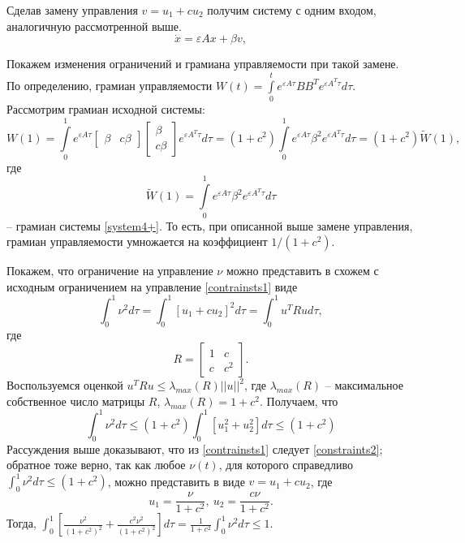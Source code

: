 \documentclass[../main.tex]{subfiles}
\begin{document}
 Сделав   замену  управления $ v = u_1 + c u_2 $ получим систему с одним входом, аналогичную рассмотренной выше.
 \begin{equation}\label{system4+}
	 \dot{x} = \varepsilon A x + \beta v, 
 \end{equation}
 
 Покажем изменения ограничений и грамиана управляемости при такой замене.
 По определению, грамиан управляемости $ W(t) = \int \limits_0 ^ t e^{\varepsilon A\tau} B B^T e^{\varepsilon A^T\tau} d\tau  $. Рассмотрим грамиан исходной системы: 
 \begin{equation*}
	 W(1) = \int \limits_0 ^ 1 e^{\varepsilon A\tau}  \left[ \begin{array}{cc}
		 \beta & c \beta
	 \end{array} \right] \left[ \begin{array}{c}
		 \beta
		 \\ c \beta 
	 \end{array} \right] e^{\varepsilon A^T\tau} d\tau = (1 + c^2)  \int \limits_0 ^ 1 e^{\varepsilon A\tau} \beta^2 e^{\varepsilon A^T\tau} d\tau = (1 + c^2) \tilde{W}(1),
 \end{equation*}
 где 
 \begin{equation*}
	 \tilde{W}(1) = \int \limits_0 ^ 1 e^{\varepsilon A\tau} \beta^2 e^{\varepsilon A^T\tau} d\tau 
 \end{equation*}
 -- грамиан системы \eqref{system4+}. То есть, при описанной выше замене управления, грамиан управляемости умножается на коэффициент $ 1/(1 + c^2)$.
 
 
 Покажем, что ограничение на управление $ \nu $  можно представить в схожем с исходным ограничением на управление \eqref{contrainsts1} виде
 \begin{equation*}
	 \int_{0}^{1} \nu ^2 d \tau  = \int_{0}^{1} \left[ u_1 + c u_2 \right]^2 d \tau =  \int_{0}^{1} u^T  R u d \tau,
 \end{equation*}
 где 
 \begin{equation*}
	 R = \left[ \begin{array}{cc}
		 1 & c \\ 
		 c & c^2
	 \end{array} \right].
 \end{equation*}
 Воспользуемся оценкой $
 u^T R u \leq \lambda_{max}(R) || u ||^2 $, где $ \lambda_{max}(R) $ -- максимальное собственное число матрицы $ R $, $ \lambda_{max}(R)  = 1 + c^2 $.
 Получаем, что
 \begin{equation}\label{constraints2}
	 \int_{0}^{1} \nu ^2 d \tau \leq (1 + c^2) \int_{0}^{1} \left[ u_1^2 + u_2^2 \right] d \tau \leq (1 + c^2)
 \end{equation}
 Рассуждения выше доказывают, что из \eqref{contrainsts1} следует \eqref{constraints2}; обратное тоже верно, так как любое $ \nu(t) $, для которого справедливо $ \int_{0}^{1} \nu ^2 d \tau \leq (1 + c^2) $, можно представить в виде $ v = u_1 + c u_2 $, где 
 \begin{equation*}
	 u_1 = \frac{\nu}{1+c^2}, \ u_2 = \frac{c \nu}{1+c^2}.
 \end{equation*}
 Тогда, $ \int_0^1 \left[ \frac{\nu^2}{(1+c^2)^2} + \frac{c^2 \nu^2}{(1+c^2)^2}\right] d \tau = \frac{1}{1+c^2} \int_{0}^{1} \nu ^2 d \tau  \leq 1 $. 
 
\end{document}
